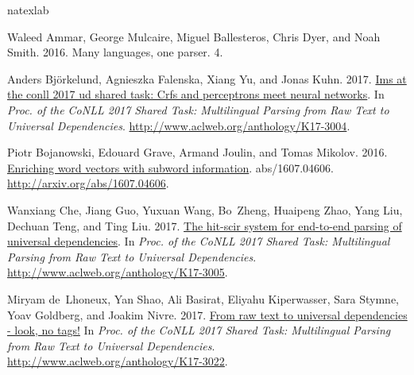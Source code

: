 \documentclass[11pt,a4paper]{article}
\begin{document}
\begin{thebibliography}{}
	\expandafter\ifx\csname natexlab\endcsname\relax\def\natexlab#1{#1}\fi
	
	Waleed Ammar, George Mulcaire, Miguel Ballesteros, Chris Dyer, and Noah Smith.
	2016.
	\newblock Many languages, one parser.
	 4.
	
	Anders Bj\"{o}rkelund, Agnieszka Falenska, Xiang Yu, and Jonas Kuhn. 2017.
	\newblock \href{http://www.aclweb.org/anthology/K17-3004}{Ims at the conll 2017
		ud shared task: Crfs and perceptrons meet neural networks}.
	\newblock In {\em Proc. of the CoNLL 2017 Shared Task: Multilingual Parsing
		from Raw Text to Universal Dependencies\/}.
	\newblock
	\href{http://www.aclweb.org/anthology/K17-3004}{http://www.aclweb.org/anthology/K17-3004}.
	
	Piotr Bojanowski, Edouard Grave, Armand Joulin, and Tomas Mikolov. 2016.
	\newblock \href{http://arxiv.org/abs/1607.04606}{Enriching word vectors with
		subword information}.
	 abs/1607.04606.
	\newblock
	\href{http://arxiv.org/abs/1607.04606}{http://arxiv.org/abs/1607.04606}.
	
	Wanxiang Che, Jiang Guo, Yuxuan Wang, Bo~Zheng, Huaipeng Zhao, Yang Liu,
	Dechuan Teng, and Ting Liu. 2017.
	\newblock \href{http://www.aclweb.org/anthology/K17-3005}{The hit-scir system
		for end-to-end parsing of universal dependencies}.
	\newblock In {\em Proc. of the CoNLL 2017 Shared Task: Multilingual Parsing
		from Raw Text to Universal Dependencies\/}.
	\newblock
	\href{http://www.aclweb.org/anthology/K17-3005}{http://www.aclweb.org/anthology/K17-3005}.
	
	Miryam de~Lhoneux, Yan Shao, Ali Basirat, Eliyahu Kiperwasser, Sara Stymne,
	Yoav Goldberg, and Joakim Nivre. 2017.
	\newblock \href{http://www.aclweb.org/anthology/K17-3022}{From raw text to
		universal dependencies - look, no tags!}
	\newblock In {\em Proc. of the CoNLL 2017 Shared Task: Multilingual Parsing
		from Raw Text to Universal Dependencies\/}.
	\newblock
	\href{http://www.aclweb.org/anthology/K17-3022}{http://www.aclweb.org/anthology/K17-3022}.
	

\end{thebibliography}
\end{document}

